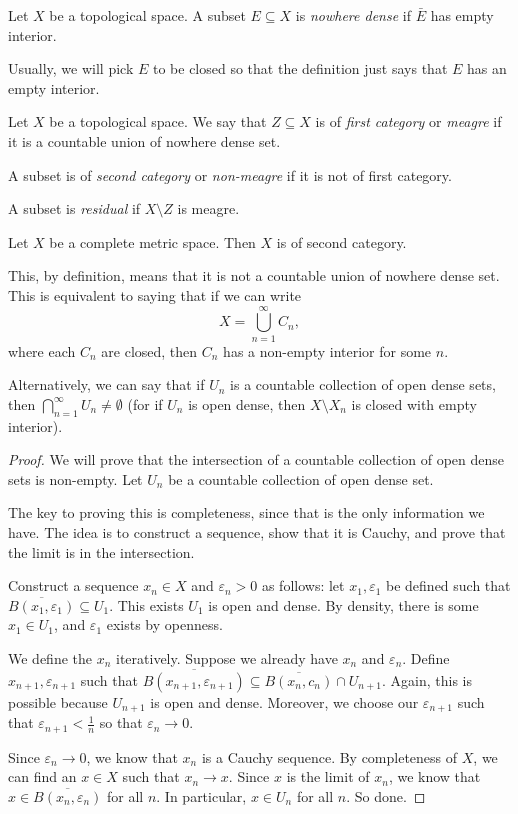 \documentclass[a4paper]{article}
\begin{document}
\begin{defi}
  Let $X$ be a topological space. A subset $E\subseteq X$ is \emph{nowhere dense} if $\bar{E}$ has empty interior.
\end{defi}
Usually, we will pick $E$ to be closed so that the definition just says that $E$ has an empty interior.

\begin{defi}
  Let $X$ be a topological space. We say that $Z\subseteq X$ is of \emph{first category} or \emph{meagre} if it is a countable union of nowhere dense set.

  A subset is of \emph{second category} or \emph{non-meagre} if it is not of first category.

  A subset is \emph{residual} if $X\setminus Z$ is meagre.
\end{defi}

\begin{thm}
  Let $X$ be a complete metric space. Then $X$ is of second category.
\end{thm}
This, by definition, means that it is not a countable union of nowhere dense set. This is equivalent to saying that if we can write
\[
  X = \bigcup_{n = 1}^\infty C_n,
\]
where each $C_n$ are closed, then $C_n$ has a non-empty interior for some $n$.

Alternatively, we can say that if $U_n$ is a countable collection of open dense sets, then $\bigcap_{n = 1}^\infty U_n \not= \emptyset$ (for if $U_n$ is open dense, then $X\setminus X_n$ is closed with empty interior).

\begin{proof}
  We will prove that the intersection of a countable collection of open dense sets is non-empty. Let $U_n$ be a countable collection of open dense set.

  The key to proving this is completeness, since that is the only information we have. The idea is to construct a sequence, show that it is Cauchy, and prove that the limit is in the intersection.

  Construct a sequence $x_n \in X$ and $\varepsilon_n > 0$ as follows: let $x_1, \varepsilon_1$ be defined such that $\overline{B(x_1, \varepsilon_1)} \subseteq U_1$. This exists $U_1$ is open and dense. By density, there is some $x_1 \in U_1$, and $\varepsilon_1$ exists by openness.

  We define the $x_n$ iteratively. Suppose we already have $x_n$ and $\varepsilon_n$. Define $x_{n + 1}, \varepsilon_{n + 1}$ such that $\overline{B(x_{n + 1}, \varepsilon_{n + 1})} \subseteq \overline{B(x_n, c_n)}\cap U_{n + 1}$. Again, this is possible because $U_{n + 1}$ is open and dense. Moreover, we choose our $\varepsilon_{n + 1}$ such that $\varepsilon_{n + 1} < \frac{1}{n}$ so that $\varepsilon_n \to 0$.

  Since $\varepsilon_n \to 0$, we know that $x_n$ is a Cauchy sequence. By completeness of $X$, we can find an $x\in X$ such that $x_n \to x$. Since $x$ is the limit of $x_n$, we know that $x\in \overline{B(x_n, \varepsilon_n)}$ for all $n$. In particular, $x\in U_n$ for all $n$. So done.
\end{proof}
\end{document}
